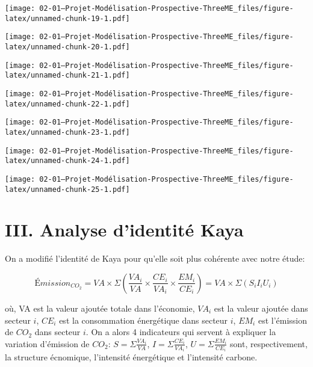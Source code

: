 \documentclass[
]{article}
\begin{document}
\texttt{[image: 02-01---Projet-Modélisation-Prospective-ThreeME\_files/figure-latex/unnamed-chunk-19-1.pdf]}

\texttt{[image: 02-01---Projet-Modélisation-Prospective-ThreeME\_files/figure-latex/unnamed-chunk-20-1.pdf]}

\texttt{[image: 02-01---Projet-Modélisation-Prospective-ThreeME\_files/figure-latex/unnamed-chunk-21-1.pdf]}

\texttt{[image: 02-01---Projet-Modélisation-Prospective-ThreeME\_files/figure-latex/unnamed-chunk-22-1.pdf]}

\texttt{[image: 02-01---Projet-Modélisation-Prospective-ThreeME\_files/figure-latex/unnamed-chunk-23-1.pdf]}

\texttt{[image: 02-01---Projet-Modélisation-Prospective-ThreeME\_files/figure-latex/unnamed-chunk-24-1.pdf]}

\texttt{[image: 02-01---Projet-Modélisation-Prospective-ThreeME\_files/figure-latex/unnamed-chunk-25-1.pdf]}

\hypertarget{iii.-analyse-didentituxe9-kaya}{%
\section{III. Analyse d'identité
Kaya}\label{iii.-analyse-didentituxe9-kaya}}

On a modifié l'identité de Kaya pour qu'elle soit plus cohérente avec
notre étude:

\[ Émission_{CO_2} = VA \times \Sigma(\frac{VA_i}{VA} \times \frac{CE_i}{VA_i} \times \frac{EM_i}{CE_i}) = VA \times\Sigma(S_iI_iU_i)\]

où, VA est la valeur ajoutée totale dans l'économie, \(VA_i\) est la
valeur ajoutée dans secteur \(i\), \(CE_i\) est la consommation
énergétique dans secteur \(i\), \(EM_i\) est l'émission de \(CO_2\) dans
secteur \(i\). On a alors 4 indicateurs qui servent à expliquer la
variation d'émission de \(CO_2\): \(S = \Sigma\frac{VA_i}{VA}\),
\(I = \Sigma\frac{CE_i}{VA_i}\), \(U = \Sigma\frac{EM_i}{CE_i}\) sont,
respectivement, la structure écnomique, l'intensité énergétique et
l'intensité carbone.
\end{document}
